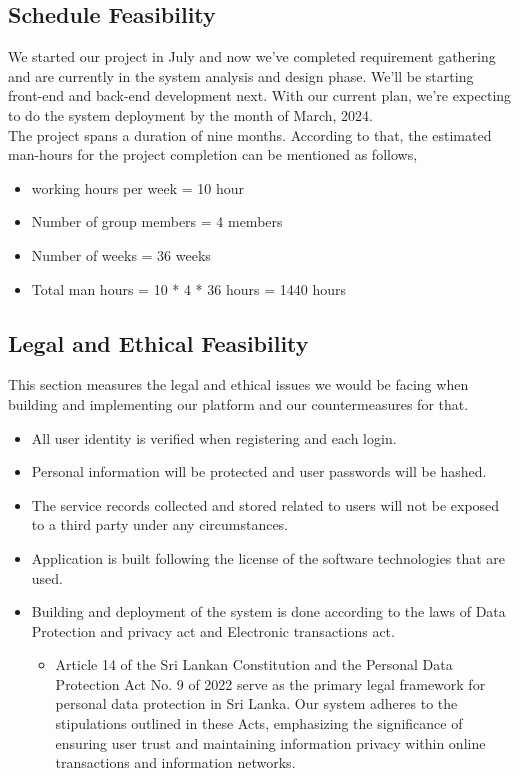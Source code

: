 \subsection{Schedule Feasibility}
We started our project in July and now we've completed requirement gathering and are currently in the system analysis and design phase. We’ll be starting front-end and back-end development next.
With our current plan, we’re expecting to do the system deployment by the month of March, 2024.\\
The project spans a duration of nine months. According to that, the estimated man-hours for the project completion can be mentioned as follows,
\begin{itemize}[label={}]
\itemsep0em 
\item working hours per week =  10 hour
\item Number of group members = 4 members 
\item Number of weeks = 36 weeks
\item Total man hours = 10 * 4 * 36 hours = 1440 hours 
\end{itemize}


\subsection{Legal and Ethical Feasibility}
This section measures the legal and ethical issues we would be facing when building and implementing our platform and our countermeasures for that.
\begin{itemize}
    \item All user identity is verified when registering and each login.
    \item Personal information will be protected and user passwords will be hashed.
    \item The service records collected and stored related to users will not be exposed to a third party under any circumstances.
    \item Application is built following the license of the software technologies that are used.
    \item Building and deployment of the system is done according to the laws of Data Protection and privacy act and Electronic transactions act.
    \begin{itemize}[label={}]
    \item Article 14 of the Sri Lankan Constitution and the Personal Data Protection Act No. 9 of 2022 serve as the primary legal framework for personal data protection in Sri Lanka. Our system adheres to the stipulations outlined in these Acts, emphasizing the significance of ensuring user trust and maintaining information privacy within online transactions and information networks.
    \end{itemize}
    
\end{itemize}





